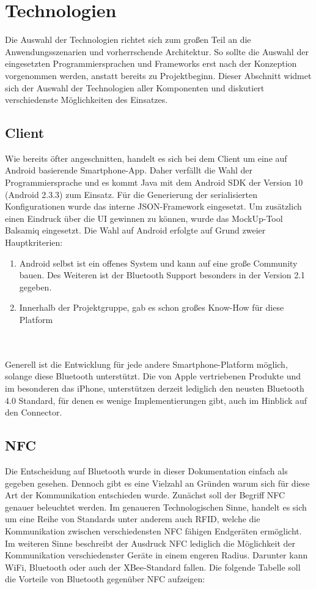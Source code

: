\section{Technologien}
Die Auswahl der Technologien richtet sich zum großen Teil an die Anwendungsszenarien und vorherrschende Architektur. So sollte die Auswahl der eingesetzten Programmiersprachen und Frameworks erst nach der Konzeption vorgenommen werden, anstatt bereits zu Projektbeginn. Dieser Abschnitt widmet sich der Auswahl der Technologien aller Komponenten und diskutiert verschiedenste Möglichkeiten des Einsatzes. 

\subsection{Client}
Wie bereits öfter angeschnitten, handelt es sich bei dem Client um eine auf Android basierende Smartphone-App. Daher verfällt die Wahl der Programmiersprache und es kommt Java mit dem Android SDK der Version 10 (Android 2.3.3) zum Einsatz. Für die Generierung der serialisierten Konfigurationen wurde das interne JSON-Framework eingesetzt. Um zusätzlich einen Eindruck über die UI gewinnen zu können, wurde das MockUp-Tool Balsamiq eingesetzt.
Die Wahl auf Android erfolgte auf Grund zweier Hauptkriterien: 

\begin{enumerate}
     \item Android selbst ist ein offenes System und kann auf eine große Community bauen. Des Weiteren ist der Bluetooth Support besonders in der Version 2.1 gegeben. 
     \item Innerhalb der Projektgruppe, gab es schon großes Know-How für diese Platform
\end{enumerate}
\\\\
Generell ist die Entwicklung für jede andere Smartphone-Platform möglich, solange diese Bluetooth unterstützt. Die von Apple vertriebenen Produkte und im besonderen das iPhone, unterstützen derzeit lediglich den neusten Bluetooth 4.0 Standard, für denen es wenige Implementierungen gibt, auch im Hinblick auf den Connector. 


\subsection{NFC}
Die Entscheidung auf Bluetooth wurde in dieser Dokumentation einfach als gegeben gesehen. Dennoch gibt es eine Vielzahl an Gründen warum sich für diese Art der Kommunikation entschieden wurde. 
Zunächst soll der Begriff NFC genauer beleuchtet werden. Im genaueren Technologischen Sinne, handelt es sich um eine Reihe von Standards unter anderem auch RFID, welche die Kommunikation zwischen verschiedensten NFC fähigen Endgeräten ermöglicht. Im weiteren Sinne beschreibt der Ausdruck NFC lediglich die Möglichkeit der Kommunikation verschiedenster Geräte in einem engeren Radius. Darunter kann WiFi, Bluetooth oder auch der XBee-Standard fallen. Die folgende Tabelle soll die Vorteile von Bluetooth gegenüber NFC aufzeigen: 


